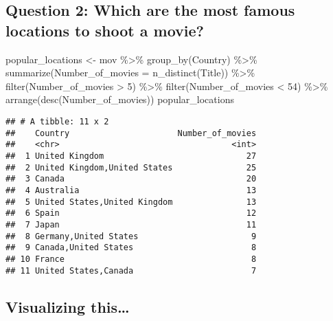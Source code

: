 \documentclass[
]{article}
\newenvironment{Shaded}{\begin{snugshade}}{\end{snugshade}}
\newcommand{\AttributeTok}[1]{\textcolor[rgb]{0.77,0.63,0.00}{#1}}
\newcommand{\DecValTok}[1]{\textcolor[rgb]{0.00,0.00,0.81}{#1}}
\newcommand{\FunctionTok}[1]{\textcolor[rgb]{0.00,0.00,0.00}{#1}}
\newcommand{\NormalTok}[1]{#1}
\newcommand{\OtherTok}[1]{\textcolor[rgb]{0.56,0.35,0.01}{#1}}
\newcommand{\SpecialCharTok}[1]{\textcolor[rgb]{0.00,0.00,0.00}{#1}}
\begin{document}
\hypertarget{q2}{%
\subsection{Question 2: Which are the most famous locations to shoot a
movie?}\label{q2}}

\begin{Shaded}
\begin{Highlighting}[]
\NormalTok{popular\_locations }\OtherTok{\textless{}{-}}\NormalTok{ mov }\SpecialCharTok{\%\textgreater{}\%}
\FunctionTok{group\_by}\NormalTok{(Country) }\SpecialCharTok{\%\textgreater{}\%}
\FunctionTok{summarize}\NormalTok{(}\AttributeTok{Number\_of\_movies =} \FunctionTok{n\_distinct}\NormalTok{(Title)) }\SpecialCharTok{\%\textgreater{}\%}
\FunctionTok{filter}\NormalTok{(Number\_of\_movies }\SpecialCharTok{\textgreater{}} \DecValTok{5}\NormalTok{) }\SpecialCharTok{\%\textgreater{}\%}
\FunctionTok{filter}\NormalTok{(Number\_of\_movies }\SpecialCharTok{\textless{}} \DecValTok{54}\NormalTok{) }\SpecialCharTok{\%\textgreater{}\%}  
\FunctionTok{arrange}\NormalTok{(}\FunctionTok{desc}\NormalTok{(Number\_of\_movies))}
\NormalTok{popular\_locations}
\end{Highlighting}
\end{Shaded}

\begin{verbatim}
## # A tibble: 11 x 2
##    Country                      Number_of_movies
##    <chr>                                   <int>
##  1 United Kingdom                             27
##  2 United Kingdom,United States               25
##  3 Canada                                     20
##  4 Australia                                  13
##  5 United States,United Kingdom               13
##  6 Spain                                      12
##  7 Japan                                      11
##  8 Germany,United States                       9
##  9 Canada,United States                        8
## 10 France                                      8
## 11 United States,Canada                        7
\end{verbatim}

\hypertarget{visualizing-this}{%
\subsection{Visualizing this\ldots{}}\label{visualizing-this}}
\end{document}
